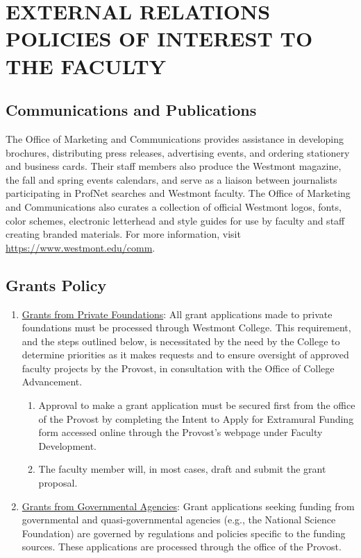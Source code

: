 \section{EXTERNAL RELATIONS POLICIES OF INTEREST TO THE FACULTY}
	\subsection{Communications and Publications}

		The Office of Marketing and Communications provides assistance in
		developing brochures, distributing press releases, advertising events,
		and ordering stationery and business cards. Their staff members also
		produce the Westmont magazine, the fall and spring events calendars, and
		serve as a liaison between journalists participating in ProfNet searches
		and Westmont faculty.  The Office of Marketing and Communications also
		curates a collection of official Westmont logos, fonts, color schemes,
		electronic letterhead and style guides for use by faculty and staff
		creating branded materials.  For more information, visit
		\href{https://www.westmont.edu/comm}{ \url{https://www.westmont.edu/comm}}.
	\subsection{Grants Policy}
		\begin{enumerate}[label=\alph*)]
			\item{\underline{Grants from Private
					Foundations}:  All grant applications made to private foundations must be processed through Westmont College.  This requirement, and the steps outlined below, is necessitated by the need by the College to determine priorities as it makes requests and to ensure oversight of approved faculty projects by the Provost, in consultation with the Office of College Advancement.
				\begin{enumerate}[label=\alph*)]
					\item{Approval to make a grant application
						must be secured first from
						the office of the Provost by
						completing the Intent to
						Apply for Extramural Funding
						form accessed online through
						the Provost's webpage under
						Faculty Development.}
					\item{The faculty member will, in most
						cases, draft and submit the
						grant proposal.}
				\end{enumerate}
			}
			\item{\underline{Grants from Governmental Agencies}:  Grant applications seeking funding from governmental and quasi-governmental agencies (e.g., the National Science Foundation) are governed by regulations and policies specific to the funding sources. These applications are processed through the office of the Provost.
			}
		\end{enumerate}
